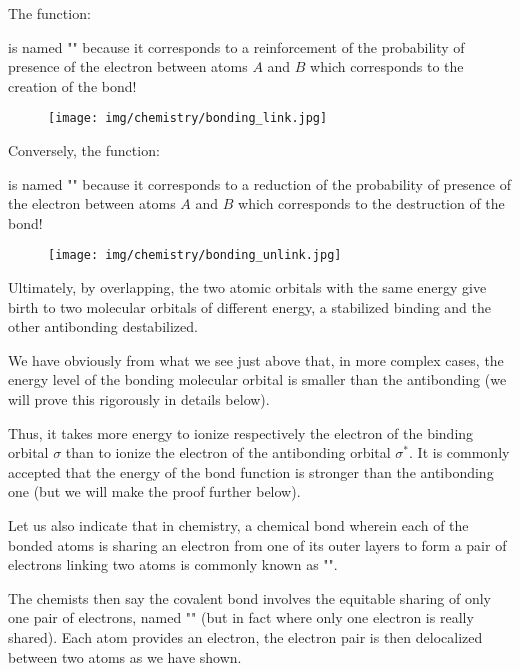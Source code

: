 	The function:
	
	is named "" because it corresponds to a reinforcement of the probability of presence of the electron between atoms $A$ and $B$ which corresponds to the creation of the bond!
	\begin{figure}[H]
		\begin{center}
		\texttt{[image: img/chemistry/bonding\_link.jpg]}
		\end{center}	
	\end{figure}
		
	Conversely, the function:
	
	is named "" because it corresponds to a reduction of the probability of presence of the electron between atoms $A$ and $B$ which corresponds to the destruction of the bond!
	\begin{figure}[H]
		\begin{center}
		\texttt{[image: img/chemistry/bonding\_unlink.jpg]}
		\end{center}	
	\end{figure}
	
	Ultimately, by overlapping, the two atomic orbitals with the same energy give birth to two molecular orbitals of different energy, a stabilized binding and the other antibonding destabilized.

	We have obviously from what we see just above that, in more complex cases, the energy level of the bonding molecular orbital is smaller than the antibonding (we will prove this rigorously in details below).

	Thus, it takes more energy to ionize respectively the electron of the binding orbital $\sigma$ than to ionize the electron of the antibonding orbital $\sigma^{*}$. It is commonly accepted that the energy of the bond function is stronger than the antibonding one (but we will make the proof further below).

	Let us also indicate that in chemistry, a chemical bond wherein each of the bonded atoms is sharing an electron from one of its outer layers to form a pair of electrons linking two atoms is commonly known as "".
	
	The chemists then say the covalent bond involves the equitable sharing of only one pair of electrons, named "" (but in fact where only one electron is really shared). Each atom provides an electron, the electron pair is then delocalized between two atoms as we have shown.

